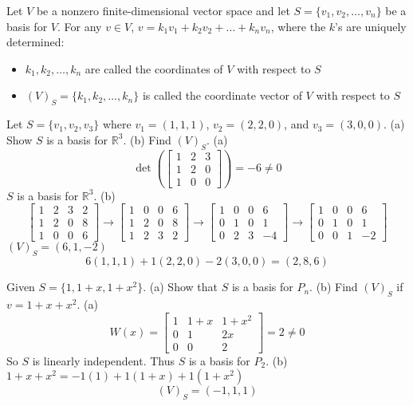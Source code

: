 \documentclass[12pt]{article}
\begin{document}
Let $V$ be a nonzero finite-dimensional vector space and let $S = \{v_1, v_2, \dots, v_n\}$ be a basis for $V$. For any $v \in V$, $v = k_1v_1 + k_2v_2 + \dots + k_nv_n$, where the $k$'s are uniquely determined: \begin{itemize} 
\item $k_1, k_2, \dots, k_n$ are called the coordinates of $V$ with respect to $S$ 
\item $(V)_S = \{k_1, k_2, \dots, k_n\}$ is called the coordinate vector of $V$ with respect to $S$ \end{itemize} 
\begin{example} Let $S = \{v_1, v_2, v_3\}$ where $v_1 = (1, 1, 1)$, $v_2 = (2, 2, 0)$, and $v_3 = (3, 0, 0)$. (a) Show $S$ is a basis for $\mathbb{R}^3$. (b) Find $(V)_S$. \newline (a) $$\det(\begin{bmatrix} 1 & 2 & 3 \\ 1 & 2 & 0 \\ 1 & 0 & 0 \end{bmatrix}) = -6 \neq 0$$ $S$ is a basis for $\mathbb{R}^3$. \newline (b) $$ \begin{bmatrix} 1 & 2 & 3 & 2 \\ 1 & 2 & 0 & 8 \\ 1 & 0 & 0 & 6 \end{bmatrix} \rightarrow \begin{bmatrix} 1 & 0 & 0 & 6 \\ 1 & 2 & 0 & 8 \\ 1 & 2 & 3 & 2 \end{bmatrix} \rightarrow \begin{bmatrix} 1 & 0 & 0 & 6 \\ 0 & 1 & 0 & 1 \\ 0 & 2 & 3 & -4 \end{bmatrix} \rightarrow \begin{bmatrix} 1 & 0 & 0 & 6 \\ 0 & 1 & 0 & 1 \\ 0 & 0 & 1 & -2 \end{bmatrix} $$ $(V)_S = (6, 1, -2)$ $$6(1, 1, 1) + 1(2, 2, 0) - 2(3, 0, 0) = (2, 8, 6) $$ \end{example} 
\begin{example} Given $S = \{1, 1 + x, 1 + x^2\}$. (a) Show that $S$ is a basis for $P_n$. (b) Find $(V)_S$ if $v = 1 + x + x^2$. \newline (a) $$ W(x) = \begin{bmatrix} 1 & 1 + x & 1 + x^2 \\ 0 & 1 & 2x \\ 0 & 0 & 2 \end{bmatrix} = 2 \neq 0 $$ So $S$ is linearly independent. Thus $S$ is a basis for $P_2$. \newline (b) $1 + x + x^2 = -1(1) + 1(1 + x) + 1(1 + x^2) $ $$ (V)_S = (-1, 1, 1)$$ \end{example} 
\end{document}
